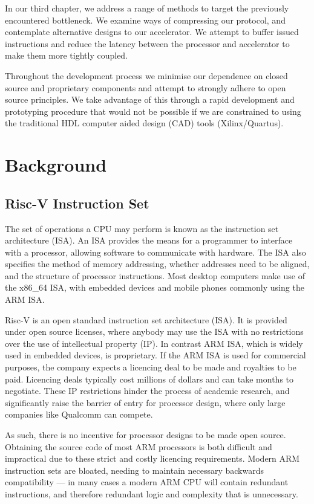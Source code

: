 \documentclass[a4paper,8pt]{report}
\begin{document}
In our third chapter, we address a range of methods to target the previously
encountered bottleneck. We examine ways of compressing our protocol, and
contemplate alternative designs to our accelerator. We attempt to buffer issued
instructions and reduce the latency between the processor and accelerator to
make them more tightly coupled.

Throughout the development process we minimise our dependence on closed source
and proprietary components and attempt to strongly adhere to open source
principles. We take advantage of this through a rapid development and
prototyping procedure that would not be possible if we are constrained to using
the traditional HDL computer aided design (CAD) tools (Xilinx/Quartus).


\chapter{Background}
\section{Risc-V Instruction Set}
The set of operations a CPU may perform is known as the instruction set
architecture (ISA). An ISA provides the means for a
programmer to interface with a processor, allowing software to communicate with
hardware. The ISA also specifies the method of memory addressing, whether
addresses need to be aligned, and the structure of processor instructions. Most
desktop computers make use of the x86\_64 ISA, with embedded devices and mobile
phones commonly using the ARM ISA.

Risc-V is an open standard instruction set architecture (ISA). It is provided
under open source licenses, where anybody may use the ISA with no restrictions
over the use of intellectual property (IP). In contrast ARM ISA, which is widely
used in embedded devices, is proprietary. If the ARM ISA is used
for commercial purposes, the company expects a licencing deal to be made and
royalties to be paid. Licencing deals typically cost millions of dollars and can
take months to negotiate. These IP restrictions hinder the process of academic
research, and significantly raise the barrier of entry for processor design,
where only large companies like Qualcomm can compete.

As such, there is no incentive for processor designs to be made open source.
Obtaining the source code of most ARM processors is both difficult and
impractical due to these strict and costly licencing requirements. Modern ARM
instruction sets are bloated, needing to maintain necessary backwards
compatibility --- in many cases a modern ARM CPU will contain redundant
instructions, and therefore redundant logic and complexity that is unnecessary.
\end{document}

